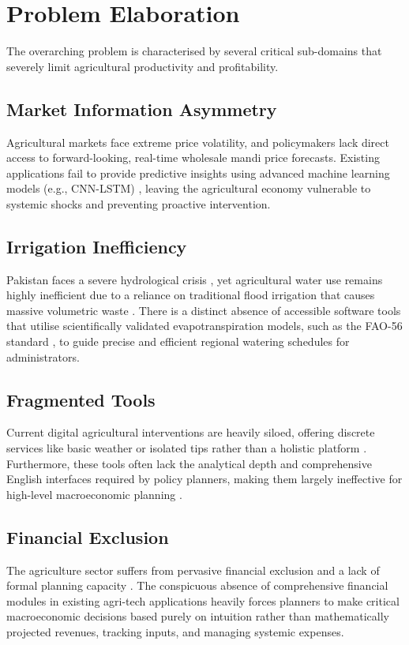 \documentclass{FastFyp}
\begin{document}
\section{Problem Elaboration}
The overarching problem is characterised by several critical sub-domains that severely limit agricultural productivity and profitability.

\subsection{Market Information Asymmetry}
Agricultural markets face extreme price volatility, and policymakers lack direct access to forward-looking, real-time wholesale mandi price forecasts. Existing applications fail to provide predictive insights using advanced machine learning models (e.g., CNN-LSTM) \cite{pide2022wheat}, leaving the agricultural economy vulnerable to systemic shocks \cite{habib2021price} and preventing proactive intervention.

\subsection{Irrigation Inefficiency}
Pakistan faces a severe hydrological crisis \cite{pcrwr2021water}, yet agricultural water use remains highly inefficient due to a reliance on traditional flood irrigation that causes massive volumetric waste \cite{worldbank2023water}. There is a distinct absence of accessible software tools that utilise scientifically validated evapotranspiration models, such as the FAO-56 standard \cite{allen1998crop}, to guide precise and efficient regional watering schedules for administrators.

\subsection{Fragmented Tools}
Current digital agricultural interventions are heavily siloed, offering discrete services like basic weather or isolated tips rather than a holistic platform \cite{pasha2024agritech}. Furthermore, these tools often lack the analytical depth and comprehensive English interfaces required by policy planners, making them largely ineffective for high-level macroeconomic planning \cite{fao2023dss}.

\subsection{Financial Exclusion}
The agriculture sector suffers from pervasive financial exclusion and a lack of formal planning capacity \cite{sbp2024finance}. The conspicuous absence of comprehensive financial modules in existing agri-tech applications heavily forces planners to make critical macroeconomic decisions based purely on intuition rather than mathematically projected revenues, tracking inputs, and managing systemic expenses.
\end{document}
